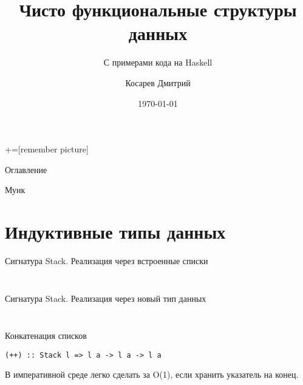 \documentclass[aspectratio=169
  , xcolor={svgnames}
  , hyperref={ colorlinks,citecolor=DeepPink4
             , linkcolor=DarkRed,urlcolor=DarkBlue}
  , russian
  ]{beamer}
\title[]{Чисто функциональные структуры данных}
\subtitle{С примерами кода на Haskell}
\author{Косарев Дмитрий }
\institute{матмех СПбГУ}
\date{\today}
\theoremstyle{exerciseStyle1}
\begin{document}
\maketitle

+=[remember picture] 

\everymath{\displaystyle}

\begin{frame}{Оглавление}
  \tableofcontents
\end{frame}

\begin{frame}[fragile]{}
Мунк
\end{frame}

\section{Индуктивные типы данных}


\begin{frame}[fragile]{Сигнатура Stack. Реализация через встроенные списки}
\begin{minipage}{.48\textwidth}
\inputminted{haskell}{code/Stack.hs}
\end{minipage}
\begin{minipage}{.48\textwidth}
\inputminted{haskell}{code/ListStack.hs}
\end{minipage}
\end{frame}

\begin{frame}[fragile]{Сигнатура Stack. Реализация через новый тип данных}
\begin{minipage}{.48\textwidth}
  \inputminted{haskell}{code/Stack.hs}
\end{minipage}
\begin{minipage}{.48\textwidth}
  \inputminted{haskell}{code/CustomStack.hs}
\end{minipage}
\end{frame}

\begin{frame}[fragile]{Конкатенация списков}
\begin{verbatim}
(++) :: Stack l => l a -> l a -> l a
\end{verbatim}
В императивной среде легко сделать за O(1), если хранить указатель на конец.
\end{frame}
\end{document}
